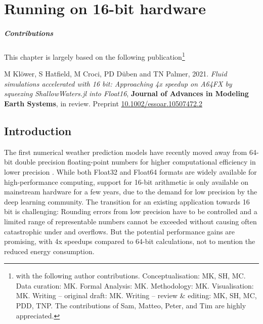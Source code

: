 \chapter{Running on 16-bit hardware}
\label{chap:hardware}

{\small
\paragraph{Contributions} This chapter is largely based on the following publication\footnote{with the following author contributions.
Conceptualisation: MK, SH, MC. Data curation: MK. Formal Analysis: MK. Methodology: MK. Visualisation: MK. Writing – original draft:
MK. Writing – review \& editing: MK, SH, MC, PDD, TNP. The contributions of Sam, Matteo, Peter, and Tim are highly appreciated.}

\vspace{\baselineskip}
\indent M Klöwer, S Hatfield, M Croci, PD Düben and TN Palmer, 2021. \emph{Fluid simulations accelerated with 16 bit:
Approaching 4x speedup on A64FX by squeezing ShallowWaters.jl into Float16}, \textbf{Journal of Advances in Modeling
Earth Systems}, in review. Preprint \href{https://doi.org/10.1002/essoar.10507472.2}{10.1002/essoar.10507472.2}
\vspace{\baselineskip}}

\section{Introduction}

The first numerical weather prediction models have recently moved away from 64-bit double precision floating-point numbers
for higher computational efficiency in lower precision \citep{Govett2017,Nakano2018,Rudisuhli2013,Vana2017}. While both Float32
and Float64 formats are widely available for high-performance computing, support for 16-bit arithmetic is only available on mainstream
hardware for a few years, due to the demand for low precision by the deep learning community. The transition for an existing application
towards 16 bit is challenging: Rounding errors from low precision have to be controlled and a limited range of representable numbers
cannot be exceeded without causing often catastrophic under and overflows. But the potential performance gains are promising,
with 4x speedups compared to 64-bit calculations, not to mention the reduced energy consumption.


